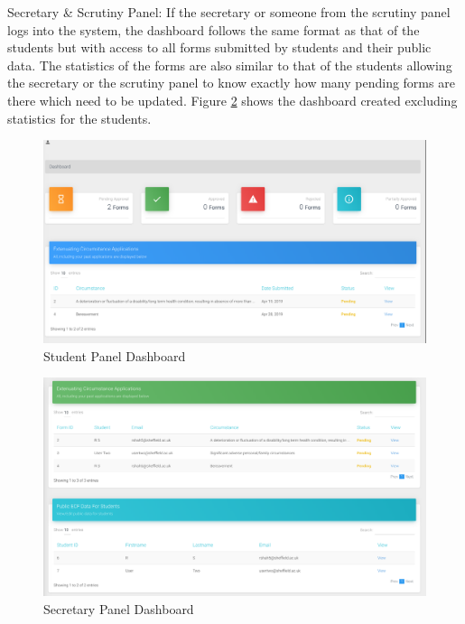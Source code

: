 \documentclass[../main.tex]{subfiles}
\begin{document}
Secretary \& Scrutiny Panel: If the secretary or someone from the scrutiny panel logs into the system, the dashboard follows the same format as that of the students but with access to all forms submitted by students and their public data. The statistics of the forms are also similar to that of the students allowing the secretary or the scrutiny panel to know exactly how many pending forms are there which need to be updated. Figure \ref{fig:secretarydashimplement} shows the dashboard created excluding statistics for the students.

\begin{figure}[H]
        \includegraphics[scale=0.7]
        {images/dashboardimplement.png}
        \caption{\label{fig:dashboardimplement} Student Panel Dashboard}
      \end{figure}

\begin{figure}[H]
        \includegraphics[scale=0.7]
        {images/secretarydashimplement.png}
        \caption{\label{fig:secretarydashimplement} Secretary Panel Dashboard}
      \end{figure}
\end{document}
